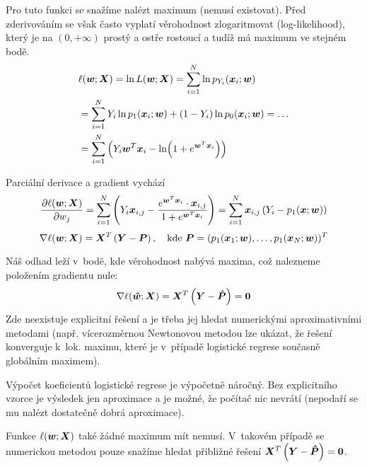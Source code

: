 Pro tuto funkci se snažíme nalézt maximum (nemusí existovat). Před zderivováním se však často vyplatí věrohodnost zlogaritmovat (log-likelihood), který je na $(0, +\infty)$ prostý a ostře rostoucí a tudíž má maximum ve stejném bodě.
\begin{align*}
     & \ell(\bm{w}; \bm{X}) = \ln L(\bm{w}; \bm{X})
    = \sum_{i=1}^{N} \ln p_{Y_i}(\bm{x}_i; \bm{w})                                                \\
     & = \sum_{i=1}^{N} Y_i \ln p_{1}(\bm{x}_i; \bm{w}) + (1 - Y_i) \ln p_{0}(\bm{x}_i; \bm{w}) = \ldots \\
     & = \sum_{i=1}^{N} \left(Y_i \bm{w}^T\bm{x}_i - \ln(1+e^{\bm{w}^T\bm{x}_i})\right)
\end{align*}

Parciální derivace a gradient vychází
\begin{equation*}
    \pdv{\ell(\bm{w}; \bm{X})}{w_j}
    = \sum_{i=1}^{N} \left(Y_i \bm{x}_{i,j} - \frac{e^{\bm{w}^T\bm{x}_i} \cdot \bm{x}_{i,j}}{1+e^{\bm{w}^T\bm{x}_i}}\right) = \sum_{i=1}^{N} \bm{x}_{i,j} \left(Y_i - p_1(\bm{x}; \bm{w})\right)
\end{equation*}
\begin{equation*}
    \nabla \ell(\bm{w}; \bm{X})
    = \bm{X}^T\left(\bm{Y} - \bm{P}\right), \quad
    \text{kde } \bm{P} = (p_1(\bm{x}_1; \bm{w}), \ldots, p_1(\bm{x}_N; \bm{w}))^T
\end{equation*}

Náš odhad leží v~bodě, kde věrohodnost nabývá maxima, což nalezneme položením gradientu nule:
\begin{equation*}
    \nabla \ell(\bm{\hat{w}}; \bm{X})
    = \bm{X}^T\left(\bm{Y} - \bm{\hat{P}}\right)
    = \bm{0}
\end{equation*}
Zde neexistuje explicitní řešení a je třeba jej hledat numerickými aproximativními metodami (např. vícerozměrnou Newtonovou metodou lze ukázat, že řešení konverguje k~lok. maximu, které je v~případě logistické regrese současně globálním maximem).

Výpočet koeficientů logistické regrese je výpočetně náročný. Bez explicitního vzorce je výsledek jen aproximace a je možné, že počítač nic nevrátí (nepodaří se mu nalézt dostatečně dobrá aproximace).

Funkce $\ell(\bm{w}; \bm{X})$ také žádné maximum mít nemusí. V~takovém případě se numerickou metodou pouze snažíme hledat přibližné řešení $\bm{X}^T\left(\bm{Y} - \bm{\hat{P}}\right) = \bm{0}$.
